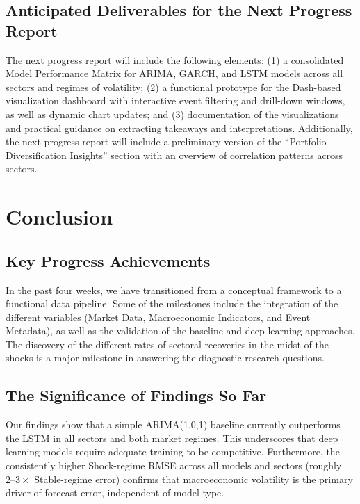 \documentclass{article}
\begin{document}
\subsection{Anticipated Deliverables for the Next Progress Report}
The next progress report will include the following elements: (1) a consolidated Model Performance Matrix for ARIMA, GARCH, and LSTM models across all sectors and regimes of volatility; (2) a functional prototype for the Dash-based visualization dashboard with interactive event filtering and drill-down windows, as well as dynamic chart updates; and (3) documentation of the visualizations and practical guidance on extracting takeaways and interpretations. Additionally, the next progress report will include a preliminary version of the “Portfolio Diversification Insights” section with an overview of correlation patterns across sectors.

\section{Conclusion}

\subsection{Key Progress Achievements}
In the past four weeks, we have transitioned from a conceptual framework to a functional data pipeline. Some of the milestones include the integration of the different variables (Market Data, Macroeconomic Indicators, and Event Metadata), as well as the validation of the baseline and deep learning approaches. The discovery of the different rates of sectoral recoveries in the midst of the shocks is a major milestone in answering the diagnostic research questions.

\subsection{The Significance of Findings So Far}
Our findings show that a simple ARIMA(1,0,1) baseline currently outperforms the LSTM in all sectors and both market regimes. This underscores that deep learning models require adequate training to be competitive. Furthermore, the consistently higher Shock-regime RMSE across all models and sectors (roughly $2\text{--}3\times$ Stable-regime error) confirms that macroeconomic volatility is the primary driver of forecast error, independent of model type.
\end{document}
